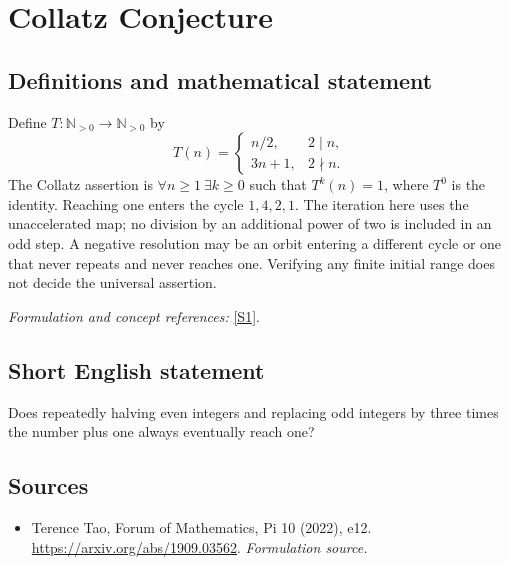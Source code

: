 \documentclass[11pt]{article}
\begin{document}
\section*{\texorpdfstring{Collatz Conjecture}{Collatz Conjecture}}\label{statement}
\subsection{Definitions and mathematical statement}
Define $T:{\mathbb{N}}_{>0}\to{\mathbb{N}}_{>0}$ by
\[
 T(n)=\begin{cases}n/2,&2\mid n,\\3n+1,&2\nmid n.\end{cases}
\]
The Collatz assertion is $\forall n\ge1\ \exists k\ge0$ such that $T^k(n)=1$, where $T^0$ is the identity. Reaching one enters the cycle $1,4,2,1$. The iteration here uses the unaccelerated map; no division by an additional power of two is included in an odd step. A negative resolution may be an orbit entering a different cycle or one that never repeats and never reaches one. Verifying any finite initial range does not decide the universal assertion.
\par\smallskip\textit{Formulation and concept references:} \href{https://arxiv.org/abs/1909.03562}{[S1]}.

\subsection{Short English statement}
Does repeatedly halving even integers and replacing odd integers by three times the number plus one always eventually reach one?
\subsection{Sources}
\begin{itemize}
\item[S1]Terence Tao, Forum of Mathematics, Pi 10 (2022), e12.
\url{https://arxiv.org/abs/1909.03562}.
\textit{Formulation source.}
\end{itemize}
\end{document}
